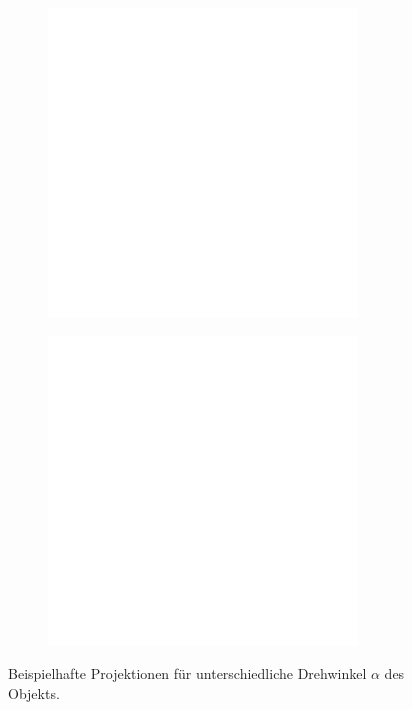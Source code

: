 \documentclass[11pt, a4paper]{article}
\numberwithin{equation}{section}
\begin{document}
\begin{figure}[ht]
	\begin{subfigure}[c]{0.5\textwidth}
		\centering
		\includegraphics[width=0.9\textwidth]{./figures/ct/Projection2_5.png}
	\end{subfigure}
	\begin{subfigure}[c]{0.5\textwidth}
		\centering
		\includegraphics[width=0.9\textwidth]{./figures/ct/Projection264.png}
	\end{subfigure}
	\caption{Beispielhafte Projektionen für unterschiedliche Drehwinkel $\alpha$ des Objekts.}
	\label{fig:ct_projektionen}
\end{figure}
\end{document}
